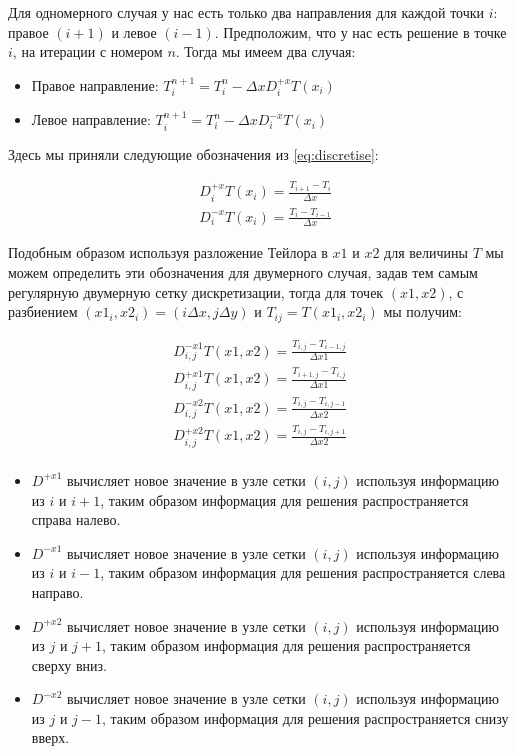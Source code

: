 Для одномерного случая у нас есть только два направления для каждой
точки $i$: правое $(i+1)$ и левое $(i - 1)$. Предположим, что у нас
есть решение в точке $i$, на итерации с номером $n$. Тогда мы имеем
два случая:
\begin{itemize}
\item Правое направление: $T_i^{n+1} = T_i^n - \Delta x D^{+x}_iT(x_i)$
\item Левое направление: $T_i^{n+1} = T_i^n - \Delta x D^{-x}_iT(x_i)$
\end{itemize}

Здесь мы приняли следующие обозначения из \eqref{eq:discretise}:

\begin{equation*}
  \begin{array}{ll}
    & D^{+x}_iT(x_i) = \frac{T_{i+1} - T_{i}}{\Delta x} \\
    & D^{-x}_iT(x_i) = \frac{T_{i} - T_{i-1}}{\Delta x}
  \end{array}
\end{equation*}

Подобным образом используя разложение Тейлора в $x1$ и $x2$ для
величины $T$ мы можем определить эти обозначения для двумерного
случая, задав тем самым регулярную двумерную сетку дискретизации,
тогда для точек $(x1,x2)$, с разбиением
$(x1_i,x2_i) = (i\Delta x,j \Delta y)$ и $T_{ij} = T(x1_i,x2_i)$ мы
получим:

\begin{equation}
  \label{eq:discrete-defines}
  \begin{array}{ll}
    D^{-x1}_{i,j}T(x1,x2) = \frac{T_{i,j} - T_{i-1,j}}{\Delta x1}  \\
    D^{+x1}_{i,j}T(x1,x2) = \frac{T_{i+1,j} - T_{i,j}}{\Delta x1}  \\
    D^{-x2}_{i,j}T(x1,x2) = \frac{T_{i,j} - T_{i,j-1}}{\Delta x2}  \\
    D^{+x2}_{i,j}T(x1,x2) = \frac{T_{i,j} - T_{i,j+1}}{\Delta x2}  \\
  \end{array}
\end{equation}

\begin{itemize}
\item $D^{+x1}$ вычисляет новое значение в узле сетки $(i,j)$ используя
  информацию из $i$ и $i+1$, таким образом информация для решения
  распространяется справа налево.

\item $D^{-x1}$ вычисляет новое значение в узле сетки $(i,j)$ используя
  информацию из $i$ и $i-1$, таким образом информация для решения
  распространяется слева направо.
\item $D^{+x2}$ вычисляет новое значение в узле сетки $(i,j)$ используя
  информацию из $j$ и $j+1$, таким образом информация для решения
  распространяется сверху вниз.

\item $D^{-x2}$ вычисляет новое значение в узле сетки $(i,j)$ используя
  информацию из $j$ и $j-1$, таким образом информация для решения
  распространяется снизу вверх.

\end{itemize}

